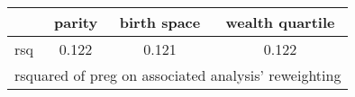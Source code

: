 \begin{tabular}{l*{3}{c}}
\toprule
            &\multicolumn{1}{c}{parity}&\multicolumn{1}{c}{birth space}&\multicolumn{1}{c}{wealth quartile}\\
\midrule
\midrule
rsq         &       0.122&       0.121&       0.122\\
\bottomrule
\multicolumn{4}{l}{\footnotesize rsquared of preg on associated analysis' reweighting}\\
\end{tabular}
